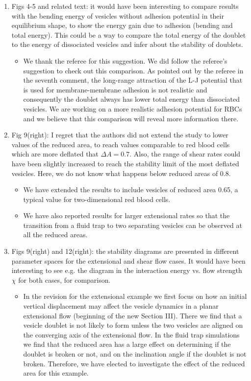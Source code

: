 \documentclass[11pt]{article}
\newcommand{\comment}[1]{{\color{blue} #1}}
\begin{document}
\begin{enumerate}
\item\comment{Figs 4-5 and related text: it would have been interesting to
compare results with the bending energy of vesicles without adhesion
potential in their equilibrium shape, to show the energy gain due to
adhesion (bending and total energy). This could be a way to compare
the total energy of the doublet to the energy of dissociated vesicles
and infer about the stability of doublets.}
\begin{itemize}
  \item We thank the referee for this suggestion. We did follow the referee's suggestion to check out this comparison. As pointed out by the referee in the seventh comment,
  the long-range attraction of the L-J potential that is used for membrane-membrane adhesion is not realistic and consequently the doublet always has lower total energy than
  dissociated vesicles. We are working on a more realistic adhesion potential for RBCs and we believe that this comparison will reveal more information there.
\end{itemize}

\item\comment{Fig 9(right): I regret that the authors did not extend the study
to lower values of the reduced area, to reach values comparable to red
blood cells which are more deflated that $\Delta A=0.7$. Also, the range
of shear rates could have been slightly increased to reach the
stability limit of the most deflated vesicles. Here, we do not know
what happens below reduced areas of 0.8.}
\begin{itemize}
  \item We have extended the results to include vesicles of reduced area
    0.65, a typical value for two-dimensional red blood cells.
  \item We have also reported results for larger extensional rates so
    that the transition from a fluid trap to two separating vesicles can
    be observed at all the reduced areas.
\end{itemize}

\item\comment{ Figs 9(right) and 12(right): the stability diagrams are presented
in different parameter spaces for the extensional and shear flow
cases. It would have been interesting to see e.g. the diagram in the
interaction energy vs. flow strength $\chi$ for both cases, for
comparison.}
\begin{itemize}
  \item In the revision for the extensional example we first focus on how an initial vertical displacement 
  may affect the vesicle dynamics in a planar extensional flow (beginning of the new Section III). 
  There we find that a vesicle doublet is not likely to form unless the two vesicles are aligned
  on the converging axis of the extensional flow. In the fluid trap simulations we find that
    the reduced area has a large effect
    on determining if the doublet is broken or not, and on the
    inclination angle if the doublet is not broken.  Therefore, we have
    elected to investigate the effect of the reduced area for this
    example.


\end{itemize}
\end{enumerate}
\end{document}
